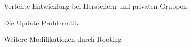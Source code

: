 \begin{frame}

	\begin{block}{}
		Verteilte Entwicklung bei Herstellern und privaten Gruppen
	\end{block}
	\begin{block}{}
		Die Update-Problematik
	\end{block}
	\begin{block}{}
		Weitere Modifikationen durch Rooting
	\end{block}

\end{frame}
